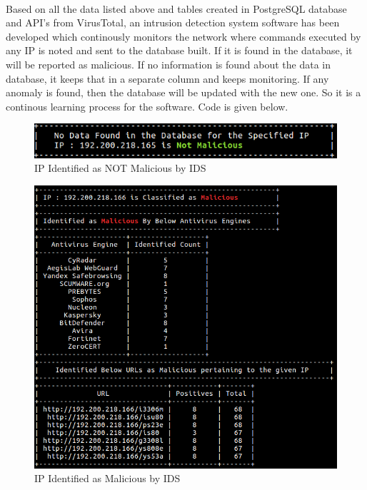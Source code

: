 \documentclass{report}
\begin{document}
\paragraph{}
Based on all the data listed above and tables created in PostgreSQL database and API's from VirusTotal, an intrusion detection system software has been developed which continously monitors the network where commands executed by any IP is noted and sent to the database built. If it is found in the database, it will be reported as malicious. If no information is found about the data in database, it keeps that in a separate column and keeps monitoring. If any anomaly is found, then the database will be updated with the new one. So it is a continous learning process for the software. Code is given below.



\begin{figure}[h!]
\centering
\caption{IP Identified as NOT Malicious by IDS}
\includegraphics[scale=0.7]{IP_not_Malicious_IDS.png}
\end{figure}

\begin{figure}[h!]
\centering
\caption{IP Identified as Malicious by IDS}
\includegraphics[scale=0.6]{IP_malicious_IDS.png}
\end{figure}
\end{document}
